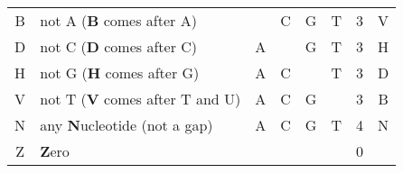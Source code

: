 \begin{table}[htbp]
{\begin{center}
\begin{tabular}{c|l|cccc|c|c}
    \hline
    B & not A (\textbf{B} comes after A) &  & \rb{} C & \rb{} G & \rb{} T & 3 & V \\
    D & not C (\textbf{D} comes after C) & \rb{} A &  & \rb{} G & \rb{} T & 3 & H \\
    H & not G (\textbf{H} comes after G) & \rb{} A & \rb{} C &  & \rb{} T & 3 & D \\
    V & not T (\textbf{V} comes after T and U) & \rb{} A & \rb{} C & \rb{} G &  & 3 & B \\
    \hline
    N & any \textbf{N}ucleotide (not a gap) & \rb{} A & \rb{} C & \rb{} G & \rb{} T & 4 & N \\
    Z & \textbf{Z}ero &  &  &  &  & 0 &
    \end{tabular}
    \end{center}
}
\end{table}

